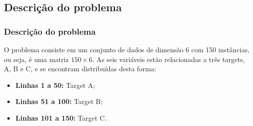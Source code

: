 \subsection[Subsection]{Descrição do problema}
\begin{frame}
    \frametitle{Descrição do problema}
    
    O problema consiste em um conjunto de dados de dimensão 6 com 150 instâncias,
    ou seja, é uma matriz $150 \times 6$. As seis variáveis estão relacionadas a três targets, A, B e
    C, e se encontram distribuídas desta forma:
    
    \begin{itemize}
        \item \textbf{Linhas 1 a 50:} Target A;
        \item \textbf{Linhas 51 a 100:} Target B;
        \item \textbf{Linhas 101 a 150:} Target C. 
    \end{itemize}
\end{frame}

